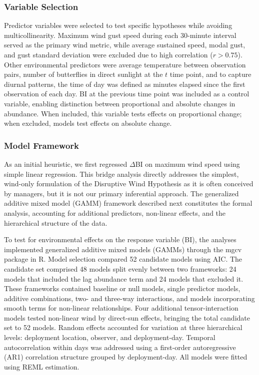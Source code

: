 \documentclass[insects,article,submit,pdftex,moreauthors]{Definitions/mdpi}
\begin{document}
\subsubsection{Variable Selection}

Predictor variables were selected to test specific hypotheses while avoiding multicollinearity. Maximum wind gust speed during each 30-minute interval served as the primary wind metric, while average sustained speed, modal gust, and gust standard deviation were excluded due to high correlation ($r > 0.75$). Other environmental predictors were average temperature between observation pairs, number of butterflies in direct sunlight at the $t$ time point, and to capture diurnal patterns, the time of day was defined as minutes elapsed since the first observation of each day. BI at the previous time point was included as a control variable, enabling distinction between proportional and absolute changes in abundance. When included, this variable tests effects on proportional change; when excluded, models test effects on absolute change.

\subsubsection{Model Framework}

As an initial heuristic, we first regressed $\Delta$BI on maximum wind speed using simple linear regression. This bridge analysis directly addresses the simplest, wind-only formulation of the Disruptive Wind Hypothesis as it is often conceived by managers, but it is not our primary inferential approach. The generalized additive mixed model (GAMM) framework described next constitutes the formal analysis, accounting for additional predictors, non-linear effects, and the hierarchical structure of the data.

To test for environmental effects on the response variable (BI), the analyses implemented generalized additive mixed models (GAMMs) through the mgcv package in R. Model selection compared 52 candidate models using AIC. The candidate set comprised 48 models split evenly between two frameworks: 24 models that included the lag abundance term and 24 models that excluded it. These frameworks contained baseline or null models, single predictor models, additive combinations, two- and three-way interactions, and models incorporating smooth terms for non-linear relationships. Four additional tensor-interaction models tested non-linear wind by direct-sun effects, bringing the total candidate set to 52 models. Random effects accounted for variation at three hierarchical levels: deployment location, observer, and deployment-day. Temporal autocorrelation within days was addressed using a first-order autoregressive (AR1) correlation structure grouped by deployment-day. All models were fitted using REML estimation.
\end{document}
